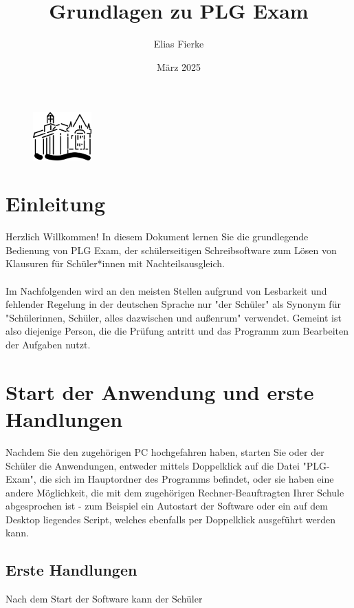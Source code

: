 \documentclass[]{article}
\title{Grundlagen zu PLG Exam}
\date{März 2025}
\author{Elias Fierke}
\begin{document}
	\begin{figure}
	\centering
		\includegraphics[width=0.2\textwidth]{plgicon.png}
	\label{fig:logo}
	\end{figure}
	\maketitle
	\tableofcontents
	\newpage
	\section{Einleitung}
	Herzlich Willkommen! In diesem Dokument lernen Sie die grundlegende Bedienung von PLG Exam, der schülerseitigen Schreibsoftware zum Lösen von Klausuren für Schüler*innen mit Nachteilsausgleich.\\\\
    Im Nachfolgenden wird an den meisten Stellen aufgrund von Lesbarkeit und fehlender Regelung in der deutschen Sprache nur "der Schüler" als Synonym für "Schülerinnen, Schüler, alles dazwischen und außenrum" verwendet. Gemeint ist also diejenige Person, die die Prüfung antritt und das Programm zum Bearbeiten der Aufgaben nutzt.
	
    \newpage
    \section{Start der Anwendung und erste Handlungen}
    Nachdem Sie den zugehörigen PC hochgefahren haben, starten Sie oder der Schüler die Anwendungen, entweder mittels Doppelklick auf die Datei "PLG-Exam", die sich im Hauptordner des Programms befindet, oder sie haben eine andere Möglichkeit, die mit dem zugehörigen Rechner-Beauftragten Ihrer Schule abgesprochen ist - zum Beispiel ein Autostart der Software oder ein auf dem Desktop liegendes Script, welches ebenfalls per Doppelklick ausgeführt werden kann.\\
    \subsection{Erste Handlungen}
    Nach dem Start der Software kann der Schüler 
\end{document}
